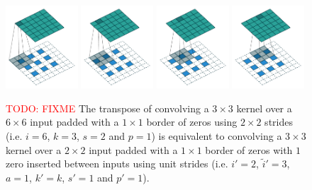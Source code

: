 \documentclass{report}
\newcommand{\todo}[1]{\textcolor{red}{TODO: #1}}
\begin{document}
\begin{figure}[p]
    \centering
    \includegraphics[width=0.24\textwidth]{pdf/padding_strides_odd_transposed_00.pdf}
    \includegraphics[width=0.24\textwidth]{pdf/padding_strides_odd_transposed_01.pdf}
    \includegraphics[width=0.24\textwidth]{pdf/padding_strides_odd_transposed_02.pdf}
    \includegraphics[width=0.24\textwidth]{pdf/padding_strides_odd_transposed_03.pdf}
    \caption{\label{fig:padding_strides_odd_transposed} \todo{FIXME} The
        transpose of convolving a $3 \times 3$ kernel over a $6 \times 6$ input
        padded with a $1 \times 1$ border of zeros using $2 \times 2$ strides
        (i.e. $i = 6$, $k = 3$, $s = 2$ and $p = 1$) is equivalent to convolving
        a $3 \times 3$ kernel over a $2 \times 2$ input padded with a $1 \times
        1$ border of zeros with $1$ zero inserted between inputs using unit
        strides (i.e. $i' = 2$, $\tilde{i}' = 3$, $a = 1$, $k' = k$, $s' = 1$
        and $p' = 1$).}
\end{figure}



\end{document}
